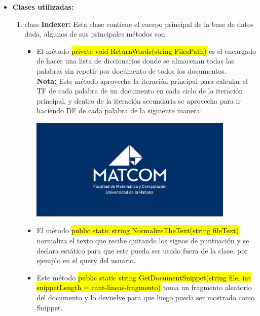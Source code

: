 \documentclass{article}
\begin{document}
    \begin{itemize}
        \item \textbf{Clases utilizadas:}
        \begin{enumerate}
            \item class \textbf{Indexer:} Esta clase contiene el cuerpo principal de la base de datos dada, algunos de
            sus principales métodos son:
                \begin{itemize}
                    \item El método \hl{private void ReturnWords(string FilesPath)} es el encargado de hacer una lista de
                    diccionarios donde se almacenan todas las palabras sin repetir por documento de todos
                    los documentos.\\

                    \scriptsize \textbf{Nota:} Este método aprovecha la iteración principal para calcular el TF de cada palabra de un documento
                    en cada ciclo de la iteración principal, y dentro de la iteración secundaria se aprovecha para ir haciendo
                    DF de cada palabra de la siguiente manera:

                    
                        \includegraphics[width=0.85\textwidth]{87f4e980-62a6-11eb-846f-4c58547cffc0.png}
                    
                    \normalsize
                    \item El método \hl{public static string NormalizeTheText(string fileText)} normaliza
                    el texto que recibe quitando los signos de puntuación y se declara estático para que este
                    pueda ser usado fuera de la clase, por ejemplo en el query del usuario.

                    \item Este método \hl{public static string GetDocumentSnippet(string file, int
                    snippetLength = cant-lineas-fragmento)} toma un fragmento aleatorio del
                    documento y lo devuelve para que luego pueda ser mostrado como Snippet.
                    

\end{itemize}
\end{enumerate}
\end{itemize}
\end{document}
